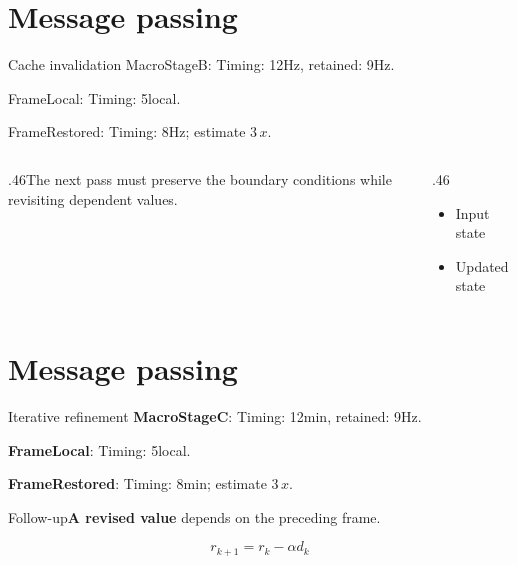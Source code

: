 \documentclass[9pt,aspectratio=43]{beamer}
\newcommand{\fuzzlayerA}[1]{\textrm{#1}}
\newcommand{\fuzzterm}[1]{\fuzzlayerA{#1}}
\newcommand{\fuzzpair}[2]{\fuzzterm{#1}: #2}
\newcommand{\fuzzunit}{Hz}
\let\fuzzoriginalunit\fuzzunit
\newcommand{\fuzzcoefficient}{3}
\newcommand{\fuzzscale}[2][\fuzzcoefficient]{#1\,#2}
\begin{document}
\section{Message passing}
\begin{frame}[t]{Cache invalidation}
\fuzzpair{MacroStageB}{Timing: 12\fuzzunit, retained: 9\fuzzoriginalunit.}\par
{\renewcommand{\fuzzunit}{local}\fuzzpair{FrameLocal}{Timing: 5\fuzzunit.}\par}
\fuzzpair{FrameRestored}{Timing: 8\fuzzunit; estimate $\fuzzscale{x}$.}\par
\begin{columns}[T]\begin{column}{.46\textwidth}The next pass must preserve the boundary conditions while revisiting dependent values.\end{column}\begin{column}{.46\textwidth}\begin{itemize}\item Input state\item Updated state\end{itemize}\end{column}\end{columns}
\end{frame}
\renewcommand{\fuzzunit}{min}
\renewcommand{\fuzzcoefficient}{3}
\renewcommand{\fuzzterm}[1]{{\textbf{#1}}}
\section{Message passing}
\begin{frame}[t]{Iterative refinement}
\fuzzpair{MacroStageC}{Timing: 12\fuzzunit, retained: 9\fuzzoriginalunit.}\par
{\renewcommand{\fuzzunit}{local}\fuzzpair{FrameLocal}{Timing: 5\fuzzunit.}\par}
\fuzzpair{FrameRestored}{Timing: 8\fuzzunit; estimate $\fuzzscale{x}$.}\par
\begin{block}{Follow-up}\fuzzterm{A revised value} depends on the preceding frame.\end{block}
\[r_{k+1}=r_k-\alpha d_k\]
\end{frame}
\renewcommand{\fuzzunit}{steps}
\renewcommand{\fuzzcoefficient}{4}
\renewcommand{\fuzzterm}[1]{{\textbf{#1}}}
\end{document}
